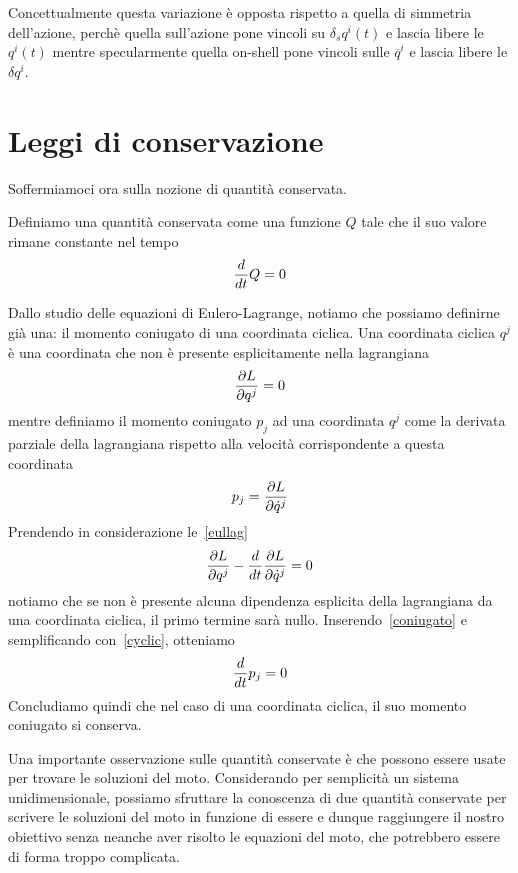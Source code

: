     Concettualmente questa variazione è opposta rispetto a quella di simmetria dell'azione, perchè quella sull'azione pone vincoli su $\delta_s q^i(t)$ e lascia libere le $q^i(t)$ mentre specularmente quella on-shell pone vincoli sulle $\overline q^i$ e lascia libere le $\delta q^i$.

\section{Leggi di conservazione}
    Soffermiamoci ora sulla nozione di quantità conservata. 
    \begin{definition}
        Definiamo una quantità conservata come una funzione $Q$ tale che il suo valore rimane constante nel tempo
    \begin{equation} \label{th}
        \frac{d}{dt} Q = 0
    \end{equation}
    \end{definition} 

    Dallo studio delle equazioni di Eulero-Lagrange, notiamo che possiamo definirne già una: il momento coniugato di una coordinata ciclica. Una coordinata ciclica $q^j$ è una coordinata che non è presente esplicitamente nella lagrangiana
    \begin{equation} \label{cyclic}
        \frac{\partial L}{\partial q^j} = 0
    \end{equation}
    mentre definiamo il momento coniugato $p_j$ ad una coordinata $q^j$ come la derivata parziale della lagrangiana rispetto alla velocità corrispondente a questa coordinata
    \begin{equation} \label{coniugato}
        p_j = \frac{\partial L}{\partial\dot q^j}
    \end{equation}
    Prendendo in considerazione le~\eqref{eullag}
    \begin{equation*}
        \frac{\partial L}{\partial q^j}  - \frac{d}{dt} \frac{\partial L}{\partial\dot q^j} = 0
    \end{equation*}
    notiamo che se non è presente alcuna dipendenza esplicita della lagrangiana da una coordinata ciclica, il primo termine sarà nullo. Inserendo~\eqref{coniugato} e semplificando con~\eqref{cyclic}, otteniamo
    \begin{equation*}
        \frac{d}{dt} p_j = 0
    \end{equation*}
    Concludiamo quindi che nel caso di una coordinata ciclica, il suo momento coniugato si conserva. 

    Una importante osservazione sulle quantità conservate è che possono essere usate per trovare le soluzioni del moto. Considerando per semplicità un sistema unidimensionale, possiamo sfruttare la conoscenza di due quantità conservate per scrivere le soluzioni del moto in funzione di essere e dunque raggiungere il nostro obiettivo senza neanche aver risolto le equazioni del moto, che potrebbero essere di forma troppo complicata. 

